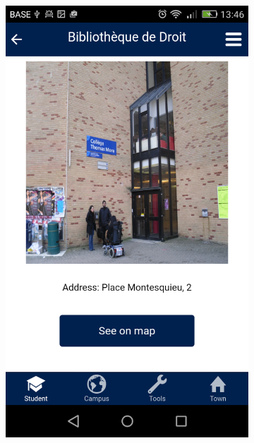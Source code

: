 \documentclass{eplmastersthesis}
\begin{document}
\begin{figure}
    \centering
\begin{subfigure}[b]{0.3\textwidth}
        \includegraphics[width=\textwidth]{Images/Application_screens/Screenshot_2016-06-06-13-46-04.png}
    \end{subfigure}
    ~ %
    \begin{subfigure}[b]{0.3\textwidth}

\end{subfigure}
\end{figure}
\end{document}
